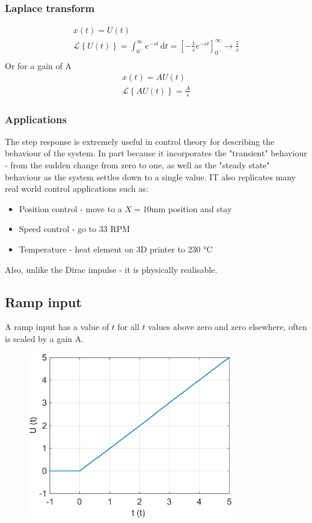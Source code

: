 \documentclass[class=report, crop=false, 12pt,a4paper, tikz, border=4mm]{standalone}
\begin{document}
\subsubsection{Laplace transform}
\begin{gather}
  x(t) = U(t)\\
  \mathcal{L} \left\{ U(t) \right\} = \int_{0^-}^{\infty} e^{-st} \,\mathrm{d}t = \left[-\frac{1}{s} e^{-st}\right]_{0^-}^{\infty} \rightarrow \frac{1}{s}\\    
\end{gather}
Or for a gain of A
\begin{gather}
  x(t) = AU(t) \\
  \mathcal{L} \left\{ AU(t) \right\} = \frac{A}{s} 
\end{gather}
\subsubsection{Applications}
The step response is extremely useful in control theory for describing the behaviour of the system. In part because it incorporates the "transient" behaviour - from the sudden change from zero to one, as well as the "steady state" behaviour as the system settles down to a single value. IT also replicates many real world control applications such as:
\begin{itemize}
  \item Position control - move to a $X=10\si{\milli\meter}$ position and stay
  \item Speed control - go to 33 RPM
  \item Temperature - heat element on 3D printer to 230 \si{\celsius}
\end{itemize}
Also, unlike the Dirac impulse - it is physically realisable.
\subsection{Ramp input}
A ramp input has a value of $t$ for all $t$ values above zero and zero elsewhere, often is scaled by a gain A.
\begin{figure}[H]
  \centering
  \includegraphics[width = 0.8\textwidth]{../img/diagram29.png}
\end{figure}
\end{document}
